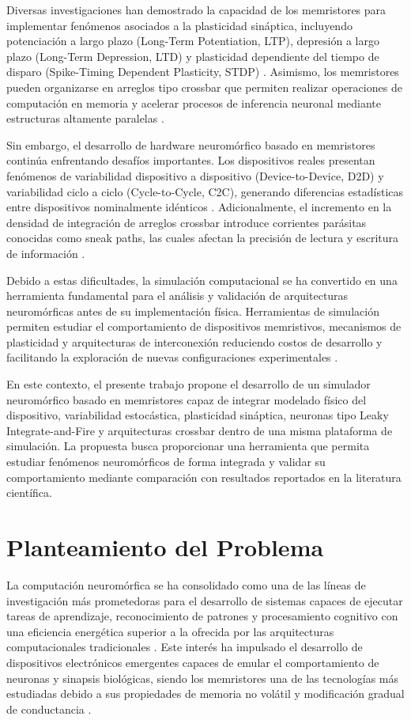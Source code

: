 Diversas investigaciones han demostrado la capacidad de los memristores para implementar fenómenos asociados a la plasticidad sináptica, incluyendo potenciación a largo plazo (Long-Term Potentiation, LTP), depresión a largo plazo (Long-Term Depression, LTD) y plasticidad dependiente del tiempo de disparo (Spike-Timing Dependent Plasticity, STDP) \cite{3,2}. Asimismo, los memristores pueden organizarse en arreglos tipo crossbar que permiten realizar operaciones de computación en memoria y acelerar procesos de inferencia neuronal mediante estructuras altamente paralelas \cite{4,5}.

Sin embargo, el desarrollo de hardware neuromórfico basado en memristores continúa enfrentando desafíos importantes. Los dispositivos reales presentan fenómenos de variabilidad dispositivo a dispositivo (Device-to-Device, D2D) y variabilidad ciclo a ciclo (Cycle-to-Cycle, C2C), generando diferencias estadísticas entre dispositivos nominalmente idénticos \cite{27,29,21}. Adicionalmente, el incremento en la densidad de integración de arreglos crossbar introduce corrientes parásitas conocidas como sneak paths, las cuales afectan la precisión de lectura y escritura de información \cite{7}.

Debido a estas dificultades, la simulación computacional se ha convertido en una herramienta fundamental para el análisis y validación de arquitecturas neuromórficas antes de su implementación física. Herramientas de simulación permiten estudiar el comportamiento de dispositivos memristivos, mecanismos de plasticidad y arquitecturas de interconexión reduciendo costos de desarrollo y facilitando la exploración de nuevas configuraciones experimentales \cite{20,23,24}.

En este contexto, el presente trabajo propone el desarrollo de un simulador neuromórfico basado en memristores capaz de integrar modelado físico del dispositivo, variabilidad estocástica, plasticidad sináptica, neuronas tipo Leaky Integrate-and-Fire y arquitecturas crossbar dentro de una misma plataforma de simulación. La propuesta busca proporcionar una herramienta que permita estudiar fenómenos neuromórficos de forma integrada y validar su comportamiento mediante comparación con resultados reportados en la literatura científica.

\section{Planteamiento del Problema}

La computación neuromórfica se ha consolidado como una de las líneas de investigación más prometedoras para el desarrollo de sistemas capaces de ejecutar tareas de aprendizaje, reconocimiento de patrones y procesamiento cognitivo con una eficiencia energética superior a la ofrecida por las arquitecturas computacionales tradicionales \cite{2,15}. Este interés ha impulsado el desarrollo de dispositivos electrónicos emergentes capaces de emular el comportamiento de neuronas y sinapsis biológicas, siendo los memristores una de las tecnologías más estudiadas debido a sus propiedades de memoria no volátil y modificación gradual de conductancia \cite{17,26}.

